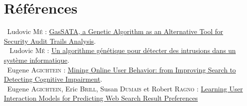 \documentclass[a4paper, 11pt]{article}
\begin{document}
\newpage
\section*{{\LARGE Références}}
\vspace{1cm}


\noindent [1]~Ludovic M\textsc{é} :  \href{http://www.rennes.supelec.fr/ren/perso/lme/PUBLI/raid98.pdf}{GasSATA, a Genetic Algorithm as an Alternative Tool for Security Audit Trails Analysis}. \\

\noindent [2]~ Ludovic M\textsc{é} :  \href{http://www.rennes.supelec.fr/rennes/si/equipe/lme/PUBLI/valgo95.pdf}{Un algorithme génétique pour détecter des intrusions dans
un système informatique}.\\

\noindent [3]~Eugene A\textsc{gichtein} : \href{http://www.cse.lehigh.edu/academics/graduate-programs/graduate-computer-engineering/2-uncategorised/235-agichtein}{Mining Online User Behavior: from Improving Search to Detecting Cognitive Impairment}.\\

\noindent [4]~Eugene A\textsc{gichtein}, Eric B\textsc{rill}, Susan D\textsc{umais} et Robert R\textsc{agno} : \href{http://research.microsoft.com/pubs/68153/sigir2006-fp338-preferences-agichtein.pdf}{Learning User Interaction Models for Predicting Web Search Result Preferences}
\end{document}
